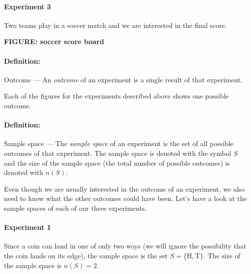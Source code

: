 \documentclass[a4paper,11pt]{report}
\def\Definition#1#2{\paragraph{Definition:} #1 --- #2}
\begin{document}
\begin{center}
\end{center}

\paragraph{Experiment 3} Two teams play in a soccer match and we are
interested in the final score.

\begin{center}
  \textbf{FIGURE: soccer score board}
\end{center}

\Definition{Outcome}{An {\em outcome} of an experiment is a single
  result of that experiment.}

Each of the figures for the experiments described above shows one
possible outcome.

\Definition{Sample space}{The {\em sample space} of an experiment is
  the set of all possible outcomes of that experiment. The sample
  space is denoted with the symbol \(S\) and the size of the sample
  space (the total number of possible outcomes) is denoted with
  \(n(S)\).}

Even though we are usually interested in the outcome of an experiment,
we also need to know what the other outcomes could have been. Let's
have a look at the sample spaces of each of our three experiments.

\paragraph{Experiment 1} Since a coin can land in one of only two ways
(we will ignore the possibility that the coin lands on its edge), the
sample space is the set \(S=\{\textrm{H}, \textrm{T}\}\). The size of the sample space
is \(n(S)=2\).

\begin{center}
\end{center}
\end{document}
